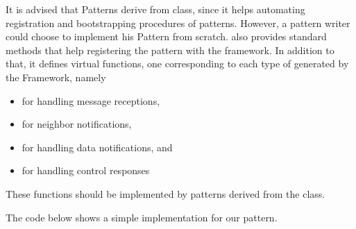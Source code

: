 It is advised that Patterns derive from  class, since it helps automating registration and bootstrapping procedures of patterns. However, a pattern writer could choose to implement his Pattern from scratch.
 also provides standard methods that help registering the pattern with the framework. 
In addition to that, it defines virtual functions, one corresponding to each type of  generated by the Framework, namely 
\begin{itemize}
 \item {} for handling message receptions, 
 \item {} for neighbor notifications, 
 \item {} for handling data notifications, and 
 \item {} for handling control responses
\end{itemize}
These functions should be implemented by patterns derived from the  class.

The code below shows a simple implementation for our  pattern.  


